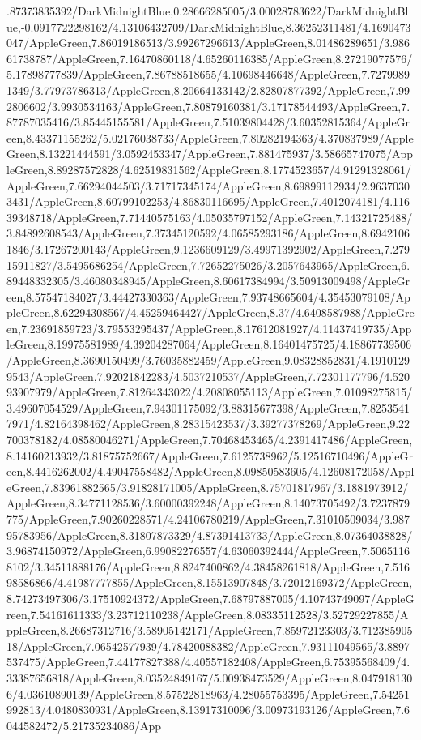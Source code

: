 {\begin{tikzternal}
.87373835392/DarkMidnightBlue,0.28666285005/3.00028783622/DarkMidnightBlue,-0.0917722298162/4.13106432709/DarkMidnightBlue,8.36252311481/4.1690473047/AppleGreen,7.86019186513/3.99267296613/AppleGreen,8.01486289651/3.98661738787/AppleGreen,7.16470860118/4.65260116385/AppleGreen,8.27219077576/5.17898777839/AppleGreen,7.86788518655/4.10698446648/AppleGreen,7.72799891349/3.77973786313/AppleGreen,8.20664133142/2.82807877392/AppleGreen,7.992806602/3.9930534163/AppleGreen,7.80879160381/3.17178544493/AppleGreen,7.87787035416/3.85445155581/AppleGreen,7.51039804428/3.60352815364/AppleGreen,8.43371155262/5.02176038733/AppleGreen,7.80282194363/4.370837989/AppleGreen,8.13221444591/3.0592453347/AppleGreen,7.881475937/3.58665747075/AppleGreen,8.89287572828/4.62519831562/AppleGreen,8.1774523657/4.91291328061/AppleGreen,7.66294044503/3.71717345174/AppleGreen,8.69899112934/2.96370303431/AppleGreen,8.60799102253/4.86830116695/AppleGreen,7.4012074181/4.11639348718/AppleGreen,7.71440575163/4.05035797152/AppleGreen,7.14321725488/3.84892608543/AppleGreen,7.37345120592/4.06585293186/AppleGreen,8.69421061846/3.17267200143/AppleGreen,9.1236609129/3.49971392902/AppleGreen,7.27915911827/3.5495686254/AppleGreen,7.72652275026/3.2057643965/AppleGreen,6.89448332305/3.46080348945/AppleGreen,8.60617384994/3.50913009498/AppleGreen,8.57547184027/3.44427330363/AppleGreen,7.93748665604/4.35453079108/AppleGreen,8.62294308567/4.45259464427/AppleGreen,8.37/4.6408587988/AppleGreen,7.23691859723/3.79553295437/AppleGreen,8.17612081927/4.11437419735/AppleGreen,8.19975581989/4.39204287064/AppleGreen,8.16401475725/4.18867739506/AppleGreen,8.3690150499/3.76035882459/AppleGreen,9.08328852831/4.19101299543/AppleGreen,7.92021842283/4.5037210537/AppleGreen,7.72301177796/4.52093907979/AppleGreen,7.81264343022/4.20808055113/AppleGreen,7.01098275815/3.49607054529/AppleGreen,7.94301175092/3.88315677398/AppleGreen,7.82535417971/4.82164398462/AppleGreen,8.28315423537/3.39277378269/AppleGreen,9.22700378182/4.08580046271/AppleGreen,7.70468453465/4.2391417486/AppleGreen,8.14160213932/3.81875752667/AppleGreen,7.6125738962/5.12516710496/AppleGreen,8.4416262002/4.49047558482/AppleGreen,8.09850583605/4.12608172058/AppleGreen,7.83961882565/3.91828171005/AppleGreen,8.75701817967/3.1881973912/AppleGreen,8.34771128536/3.60000392248/AppleGreen,8.14073705492/3.7237879775/AppleGreen,7.90260228571/4.24106780219/AppleGreen,7.31010509034/3.98795783956/AppleGreen,8.31807873329/4.87391413733/AppleGreen,8.07364038828/3.96874150972/AppleGreen,6.99082276557/4.63060392444/AppleGreen,7.50651168102/3.34511888176/AppleGreen,8.8247400862/4.38458261818/AppleGreen,7.51698586866/4.41987777855/AppleGreen,8.15513907848/3.72012169372/AppleGreen,8.74273497306/3.17510924372/AppleGreen,7.68797887005/4.10743749097/AppleGreen,7.54161611333/3.23712110238/AppleGreen,8.08335112528/3.52729227855/AppleGreen,8.26687312716/3.58905142171/AppleGreen,7.85972123303/3.71238590518/AppleGreen,7.06542577939/4.78420088382/AppleGreen,7.93111049565/3.8897537475/AppleGreen,7.44177827388/4.40557182408/AppleGreen,6.75395568409/4.33387656818/AppleGreen,8.03524849167/5.00938473529/AppleGreen,8.0479181306/4.03610890139/AppleGreen,8.57522818963/4.28055753395/AppleGreen,7.54251992813/4.0480830931/AppleGreen,8.13917310096/3.00973193126/AppleGreen,7.6044582472/5.21735234086/App
\end{tikzternal}}
